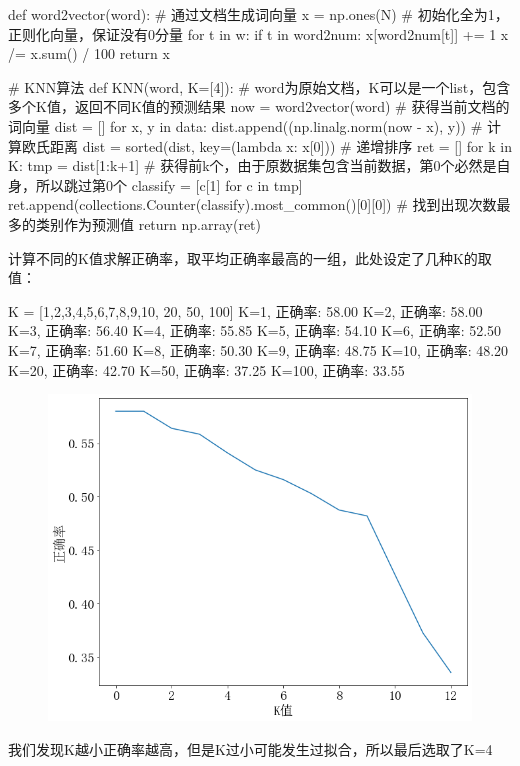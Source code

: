 \documentclass[12pt, a4paper, oneside]{ctexart}
\numberwithin{equation}{section}  %
\begin{document}
\begin{pythoncode}
def word2vector(word):  # 通过文档生成词向量
    x = np.ones(N)  # 初始化全为1，正则化向量，保证没有0分量
    for t in w:
        if t in word2num:
            x[word2num[t]] += 1
    x /= x.sum() / 100
    return x
\end{pythoncode}
\begin{pythoncode}
# KNN算法
def KNN(word, K=[4]):  # word为原始文档，K可以是一个list，包含多个K值，返回不同K值的预测结果
    now = word2vector(word)  # 获得当前文档的词向量
    dist = []
    for x, y in data:
        dist.append((np.linalg.norm(now - x), y))  # 计算欧氏距离
    dist = sorted(dist, key=(lambda x: x[0]))  # 递增排序
    ret = []
    for k in K:
        tmp = dist[1:k+1]  # 获得前k个，由于原数据集包含当前数据，第0个必然是自身，所以跳过第0个
        classify = [c[1] for c in tmp]
        ret.append(collections.Counter(classify).most_common()[0][0])  # 找到出现次数最多的类别作为预测值
    return np.array(ret)
\end{pythoncode}
计算不同的K值求解正确率，取平均正确率最高的一组，此处设定了几种K的取值：
\begin{pythoncode}
K = [1,2,3,4,5,6,7,8,9,10, 20, 50, 100]
K=1, 正确率: 58.00%
K=2, 正确率: 58.00%
K=3, 正确率: 56.40%
K=4, 正确率: 55.85%
K=5, 正确率: 54.10%
K=6, 正确率: 52.50%
K=7, 正确率: 51.60%
K=8, 正确率: 50.30%
K=9, 正确率: 48.75%
K=10, 正确率: 48.20%
K=20, 正确率: 42.70%
K=50, 正确率: 37.25%
K=100, 正确率: 33.55%
\end{pythoncode}
\begin{figure}[htbp]
    \centering
    \includegraphics[scale=0.5]{note.figure/不同K值正确率曲线.png}
\end{figure}
我们发现K越小正确率越高，但是K过小可能发生过拟合，所以最后选取了K=4
\end{document}
